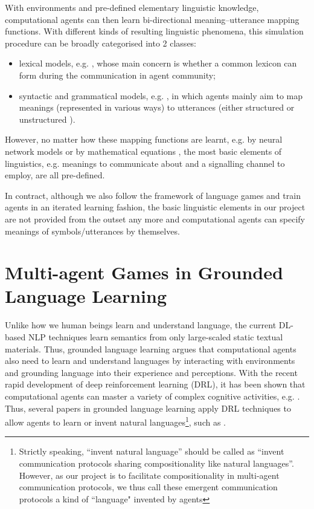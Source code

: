 With environments and pre-defined elementary linguistic knowledge, computational agents can then learn bi-directional meaning–utterance mapping functions\cite{gong2013computer}. With different kinds of resulting linguistic phenomena, this simulation procedure can be broadly categorised into 2 classes:
\begin{itemize}
  \item lexical models, e.g. \cite{steels2005emergence, baronchelli2006sharp, puglisi2008cultural}, whose main concern is whether a common lexicon can form during the communication in agent community;
  \item syntactic and grammatical models, e.g. \cite{kirby1999function, vogt2005acquisition}, in which agents mainly aim to map meanings (represented in various ways) to utterances (either structured or unstructured ).
\end{itemize}

However, no matter how these mapping functions are learnt, e.g. by neural network models \cite{munroe2002learning} or by mathematical equations \cite{minett2008modelling, ke2008language}, the most basic elements of linguistics, e.g. meanings to communicate about and a signalling channel to employ, are all pre-defined.

In contract, although we also follow the framework of language games and train agents in an iterated learning fashion, the basic linguistic elements in our project are not provided from the outset any more and computational agents can specify meanings of symbols/utterances by themselves.

\section{Multi-agent Games in Grounded Language Learning}
\label{sec2.2:gll}

Unlike how we human beings learn and understand language, the current DL-based NLP techniques learn semantics from only large-scaled static textual materials. Thus, grounded language learning argues that computational agents also need to learn and understand languages by interacting with environments and grounding language into their experience and perceptions. With the recent rapid development of deep reinforcement learning (DRL), it has been shown that computational agents can master a variety of complex cognitive activities, e.g. \cite{mnih2015human, silver2017mastering}. Thus, several papers in grounded language learning apply DRL techniques to allow agents to learn or invent natural languages\footnote{Strictly speaking, ``invent natural language'' should be called as ``invent communication protocols sharing compositionality like natural languages''. However, as our project is to facilitate compositionality in multi-agent communication protocols, we thus call these emergent communication protocols a kind of ``language" invented by agents}, such as \cite{hermann2017grounded, mordatch2018emergence, havrylov2017emergence, hill2017understanding}.

